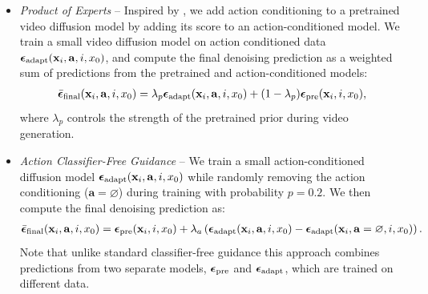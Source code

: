 \begin{itemize}[leftmargin=*, topsep=0pt]
    \item \textit{Product of Experts} -- Inspired by \citet{yang2024probabilistic}, we add action conditioning to a pretrained video diffusion model by adding its score to an action-conditioned model.
    We train a small video diffusion model on action conditioned data $\boldsymbol{\epsilon}_{\textnormal{adapt}}(\mathbf{x}_i, \mathbf{a}, i, x_0)$, and compute the final denoising prediction as a weighted sum of predictions from the pretrained and action-conditioned models:
    \begin{align*}
    \bar{\boldsymbol{\epsilon}}_{\textnormal{final}}(\mathbf{x}_i, \mathbf{a}, i, x_0) = \lambda_{p}\boldsymbol{\epsilon}_{\textnormal{adapt}}(\mathbf{x}_i, \mathbf{a}, i, x_0) + (1-\lambda_{p}) \boldsymbol{\epsilon}_{\textnormal{pre}}(\mathbf{x}_i, i, x_0),
    \end{align*}
    where $\lambda_{p}$ controls the strength of the pretrained prior  during video generation.
    \item \textit{Action Classifier-Free Guidance} \citep{ho2022classifier} -- We train a small action-conditioned diffusion model $\boldsymbol{\epsilon}_{\textnormal{adapt}}(\mathbf{x}_i, \mathbf{a}, i, x_0)$  while randomly removing the action conditioning ($\mathbf{a} = \varnothing$) during training with probability $p=0.2$. 
    We then compute the final denoising prediction as:
    \begin{align*}
        \bar{\boldsymbol{\epsilon}}_{\textnormal{final}}(\mathbf{x}_i, \mathbf{a}, i, x_0) = \boldsymbol{\epsilon}_{\textnormal{pre}}(\mathbf{x}_i, i, x_0) + \lambda_{a} \left(\boldsymbol{\epsilon}_{\textnormal{adapt}}(\mathbf{x}_i, \mathbf{a}, i, x_0) - \boldsymbol{\epsilon}_{\textnormal{adapt}}(\mathbf{x}_i, \mathbf{a} = \varnothing, i, x_0)\right).
    \end{align*}
    Note that unlike standard classifier-free guidance this approach combines predictions from two separate models, $\boldsymbol{\epsilon}_{\textnormal{pre}}$ and $\boldsymbol{\epsilon}_{\textnormal{adapt}} $, which are trained on different data.
\end{itemize}

